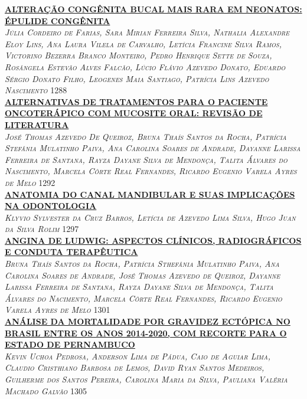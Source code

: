 \noindent \textsc{\hyperlink{trabalhos/251486.pdf.1}{\textbf{ALTERAÇÃO CONGÊNITA BUCAL MAIS RARA EM NEONATOS: ÉPULIDE CONGÊNITA}}}\\ 
\noindent \textsc{\textit{Júlia Cordeiro de Farias, Sara Mirian Ferreira Silva, Nathalia Alexandre Eloy Lins, Ana Laura Vilela de Carvalho, Letícia Francine Silva Ramos, Victorino Bezerra Branco Monteiro, Pedro Henrique Sette de Souza, Rosângela Estevão Alves Falcão, Lúcio Flávio Azevedo Donato, Eduardo Sérgio Donato Filho, Leogenes Maia Santiago, Patrícia Lins Azevedo Nascimento}} \hfill 1288\\ 

\noindent \textsc{\hyperlink{trabalhos/249975.pdf.1}{\textbf{ALTERNATIVAS DE TRATAMENTOS PARA O PACIENTE ONCOTERÁPICO COM MUCOSITE ORAL: REVISÃO DE LITERATURA}}}\\ 
\noindent \textsc{\textit{José Thomas Azevedo De Queiroz, Bruna Thaís Santos da Rocha, Patrícia Stefânia Mulatinho Paiva, Ana Carolina Soares de Andrade, Dayanne Larissa Ferreira de Santana, Rayza Dayane Silva de Mendonça, Talita Álvares do Nascimento, Marcela Côrte Real Fernandes, Ricardo Eugenio Varela Ayres de Melo}} \hfill 1292\\ 

\noindent \textsc{\hyperlink{trabalhos/251820.pdf.1}{\textbf{ANATOMIA DO CANAL MANDIBULAR E SUAS IMPLICAÇÕES NA ODONTOLOGIA}}}\\ 
\noindent \textsc{\textit{Klyvio Sylvester da Cruz Barros, Letícia de Azevedo Lima Silva, Hugo Juan da Silva Rolim}} \hfill 1297\\ 

\noindent \textsc{\hyperlink{trabalhos/250073.pdf.1}{\textbf{ANGINA DE LUDWIG: ASPECTOS CLÍNICOS, RADIOGRÁFICOS E CONDUTA TERAPÊUTICA}}}\\ 
\noindent \textsc{\textit{Bruna Thaís Santos da Rocha, Patrícia Sthefânia Mulatinho Paiva, Ana Carolina Soares de Andrade, José Thomas Azevedo de Queiroz, Dayanne Larissa Ferreira de Santana, Rayza Dayane Silva de Mendonça, Talita Álvares do Nacimento, Marcela Côrte Real Fernandes, Ricardo Eugenio Varela Ayres de Melo}} \hfill 1301\\ 

\noindent \textsc{\hyperlink{trabalhos/250286.pdf.1}{\textbf{ANÁLISE DA MORTALIDADE POR GRAVIDEZ ECTÓPICA NO BRASIL ENTRE OS ANOS  2014-2020, COM RECORTE PARA O ESTADO DE PERNAMBUCO}}}\\ 
\noindent \textsc{\textit{Kevin Uchoa Pedrosa, Anderson Lima de Pádua, Caio de Aguiar Lima, Claudio Cristhiano Barbosa de Lemos, David Ryan Santos Medeiros, Guilherme dos Santos Pereira, Carolina Maria da Silva, Pauliana Valéria Machado Galvão}} \hfill 1305\\ 


